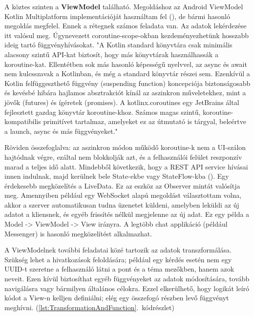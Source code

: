 A köztes szinten a \textbf{ViewModel} található.  
Megoldáshoz az Android ViewModel Kotlin Multiplatform implementációját használtam fel (), de bármi hasonló megoldás megfelel.  
Ennek a rétegnek számos feladata van.  
Az adatok lekérdezése itt valósul meg. Úgynevezett coroutine-scope-okban kezdeményezhetünk hosszabb ideig tartó függvényhívásokat.  
"A Kotlin standard könyvtára csak minimális alacsony szintű API-kat biztosít, hogy más könyvtárak használhassák a koroutine-kat. Ellentétben sok más hasonló képességű nyelvvel, az async és await nem kulcsszavak a Kotlinban, és még a standard könyvtár részei sem.  
Ezenkívül a Kotlin felfüggeszthető függvény (suspending function) koncepciója biztonságosabb és kevésbé hibára hajlamos absztrakciót kínál az aszinkron műveletekhez, mint a jövők (futures) és ígéretek (promises).  
A kotlinx.coroutines egy JetBrains által fejlesztett gazdag könyvtár koroutine-khoz. Számos magas szintű, koroutine-kompatibilis primitívet tartalmaz, amelyeket ez az útmutató is tárgyal, beleértve a launch, async és más függvényeket." \cite{Coroutine}  

Röviden összefoglalva: az aszinkron módon működő koroutine-k nem a UI-szálon hajtódnak végre, ezáltal nem blokkolják azt, és a felhasználói felület reszponzív marad a teljes idő alatt.  
Mindebből következik, hogy a REST API service hívásai innen indulnak, majd kerülnek bele State-ekbe vagy StateFlow-kba ().  
Egy érdekesebb megközelítés a LiveData. Ez az eszköz az Observer mintát valósítja meg.  
Amennyiben például egy WebSocket alapú megoldást választottam volna, akkor a szerver automatikusan tudna üzenetet küldeni, amelyben leküldi az új adatot a kliensnek, és egyéb frissítés nélkül megjelenne az új adat.  
Ez egy példa a Model -> ViewModel -> View irányra. A legtöbb chat applikáció (például Messenger) is hasonló megközelítést alkalmazhat.

A ViewModelnek további feladatai közé tartozik az adatok transzformálása.  
Szükség lehet a hivatkozások feloldására; például egy kérdés esetén nem egy UUID-t szeretne a felhasználó látni a pont és a téma mezőkben, hanem azok neveit.  
Ezen kívül biztosíthat egyéb függvényeket az adatok módosítására, tovább navigálásra vagy bármilyen általános célokra.  
Ezzel elkerülhető, hogy logikát leíró kódot a View-n kelljen definiálni; elég egy összefogó részben levő függvényt meghívni. (\ref{lst:TransformationAndFunction}.~kódrészlet)

